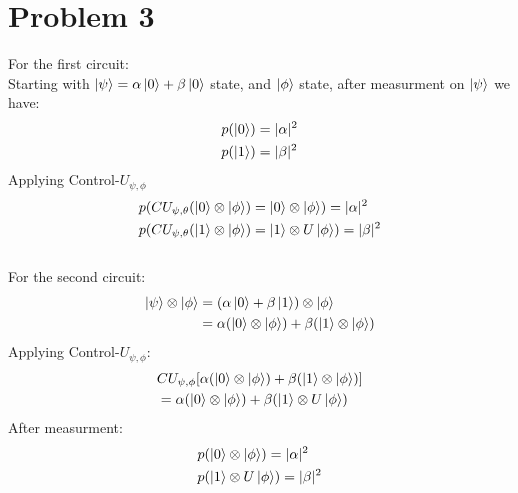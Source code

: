 \documentclass[12pt]{article}
\begin{document}
\section*{Problem 3}
For the first circuit: \\
Starting with \(\ket{\psi} = \alpha \ket{0} + \beta \ket{0}\) state, and \(\ket{\phi}\) state, after measurment on \(\ket{\psi}\) we have:
\begin{align*}
    p(\ket{0}) &= |\alpha|^2 \\
    p(\ket{1}) &= |\beta|^2
\end{align*}
Applying Control-\(U_{\psi,\phi}\) 
\begin{align*}
    &p(CU_{\psi,\theta}(\ket{0} \otimes \ket{\phi}) = \ket{0} \otimes \ket{\phi}) = |\alpha|^2 \\
    &p(CU_{\psi,\theta}(\ket{1} \otimes \ket{\phi}) = \ket{1} \otimes U\ket{\phi}) = |\beta|^2
\end{align*}
\\
For the second circuit: \\
\begin{align*}
    \ket{\psi} \otimes \ket{\phi} &= (\alpha \ket{0} + \beta \ket{1}) \otimes \ket{\phi} \\ 
    &= \alpha (\ket{0} \otimes \ket{\phi}) + \beta (\ket{1} \otimes \ket{\phi})
\end{align*}
Applying Control-\(U_{\psi,\phi}\):
\begin{align*}
    &CU_{\psi,\phi}[\alpha (\ket{0} \otimes \ket{\phi}) + \beta (\ket{1} \otimes \ket{\phi})]\\
    &= \alpha (\ket{0} \otimes \ket{\phi}) + \beta (\ket{1} \otimes U\ket{\phi})
\end{align*}
After measurment: 
\begin{align*}
    &p(\ket{0} \otimes \ket{\phi}) = |\alpha|^2 \\
    &p(\ket{1} \otimes U\ket{\phi}) = |\beta|^2
\end{align*}
\end{document}

